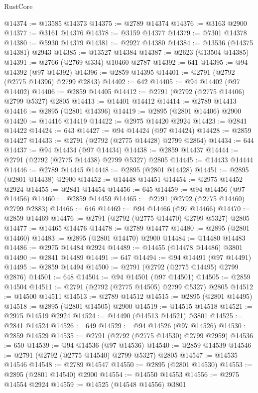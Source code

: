 \begin{lexlean}{RustCore}
\begin{coremodule}
@14374 := @13585 @14373
@14375 := @2789 @14374
@14376 := @3163 @2900
@14377 := @3161 @14376
@14378 := @3159 @14377
@14379 := @7301 @14378
@14380 := @5930 @14379
@14381 := @2927 @14380
@14384 := @13536 (@14375 @14381) @2943
@14385 := @13527 @14384
@14387 := @2623 (@13504 @14385)
@14391 := @2766 (@2769 @334) @10460 @2787
@14392 := 641
@14395 := @94 @14392 (@97 @14392)
@14396 := @2859 @14395
@14401 := @2791 (@2792 (@2775 @14396) @2799 @2843)
@14402 := 642
@14405 := @94 @14402 (@97 @14402)
@14406 := @2859 @14405
@14412 := @2791 (@2792 (@2775 @14406) @2799 @5327) @2805
@14413 := @14401 @14412
@14414 := @2789 @14413
@14416 := @2895 (@2801 @14396)
@14419 := @2895 (@2801 @14406) @2900
@14420 := @14416 @14419
@14422 := @2975 @14420 @2924
@14423 := @2841 @14422
@14424 := 643
@14427 := @94 @14424 (@97 @14424)
@14428 := @2859 @14427
@14433 := @2791 (@2792 (@2775 @14428) @2799 @2864)
@14434 := 644
@14437 := @94 @14434 (@97 @14434)
@14438 := @2859 @14437
@14444 := @2791 (@2792 (@2775 @14438) @2799 @5327) @2805
@14445 := @14433 @14444
@14446 := @2789 @14445
@14448 := @2895 (@2801 @14428)
@14451 := @2895 (@2801 @14438) @2900
@14452 := @14448 @14451
@14454 := @2975 @14452 @2924
@14455 := @2841 @14454
@14456 := 645
@14459 := @94 @14456 (@97 @14456)
@14460 := @2859 @14459
@14465 := @2791 (@2792 (@2775 @14460) @2799 @2883)
@14466 := 646
@14469 := @94 @14466 (@97 @14466)
@14470 := @2859 @14469
@14476 := @2791 (@2792 (@2775 @14470) @2799 @5327) @2805
@14477 := @14465 @14476
@14478 := @2789 @14477
@14480 := @2895 (@2801 @14460)
@14483 := @2895 (@2801 @14470) @2900
@14484 := @14480 @14483
@14486 := @2975 @14484 @2924
@14489 := @14455 (@14478 @14486) @3801
@14490 := @2841 @14489
@14491 := 647
@14494 := @94 @14491 (@97 @14491)
@14495 := @2859 @14494
@14500 := @2791 (@2792 (@2775 @14495) @2799 @2876)
@14501 := 648
@14504 := @94 @14501 (@97 @14501)
@14505 := @2859 @14504
@14511 := @2791 (@2792 (@2775 @14505) @2799 @5327) @2805
@14512 := @14500 @14511
@14513 := @2789 @14512
@14515 := @2895 (@2801 @14495)
@14518 := @2895 (@2801 @14505) @2900
@14519 := @14515 @14518
@14521 := @2975 @14519 @2924
@14524 := @14490 (@14513 @14521) @3801
@14525 := @2841 @14524
@14526 := 649
@14529 := @94 @14526 (@97 @14526)
@14530 := @2859 @14529
@14535 := @2791 (@2792 (@2775 @14530) @2799 @2959)
@14536 := 650
@14539 := @94 @14536 (@97 @14536)
@14540 := @2859 @14539
@14546 := @2791 (@2792 (@2775 @14540) @2799 @5327) @2805
@14547 := @14535 @14546
@14548 := @2789 @14547
@14550 := @2895 (@2801 @14530)
@14553 := @2895 (@2801 @14540) @2900
@14554 := @14550 @14553
@14556 := @2975 @14554 @2924
@14559 := @14525 (@14548 @14556) @3801

\end{coremodule}
\end{lexlean}
